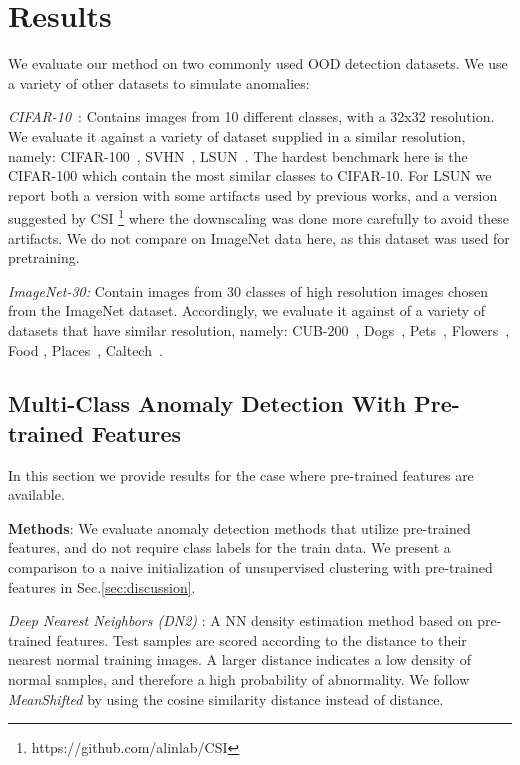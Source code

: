 \documentclass[runningheads]{llncs}
\begin{document}
\section{Results}
\label{sec:results}

We evaluate our method on two commonly used OOD detection datasets. We use a variety of other datasets to simulate anomalies:

\textit{CIFAR-10}~\cite{krizhevsky2009learning}: Contains images from 10 different classes, with a 32x32 resolution. We evaluate it against a variety of dataset supplied in a similar resolution, namely: CIFAR-100~\cite{krizhevsky2009learning}, SVHN~\cite{netzer2011reading}, LSUN~\cite{yu2015lsun}. The hardest benchmark here is the CIFAR-100 which contain the most similar classes to CIFAR-10. For LSUN we report both a version with some artifacts used by previous works, and a version suggested by CSI \cite{tack2020csi}\footnote{https://github.com/alinlab/CSI} where the downscaling was done more carefully to avoid these artifacts. We do not compare on ImageNet\cite{deng2009imagenet} data here, as this dataset was used for pretraining.



\textit{ImageNet-30:} Contain images from 30 classes of high resolution images chosen from the ImageNet\cite{deng2009imagenet} dataset. Accordingly, we evaluate it against of a variety of datasets that have similar resolution, namely: CUB-200~\cite{WelinderEtal2010}, Dogs~\cite{deng2009imagenet}, Pets~\cite{parkhi12a}, Flowers~\cite{Nilsback08}, Food \cite{bossard14}, Places~\cite{zhou2014learning}, Caltech~\cite{fei2004learning}. 



\subsection{Multi-Class Anomaly Detection With Pre-trained Features}
\label{sec:res_pre-trained}

In this section we provide results for the case where pre-trained features are available. 

\textbf{Methods}: We evaluate anomaly detection methods that utilize pre-trained features, and do not require class labels for the train data. We present a comparison to a naive initialization of unsupervised clustering with pre-trained features in Sec.\ref{sec:discussion}.

\textit{Deep Nearest Neighbors (DN2)} \cite{reiss2021panda}: A NN density estimation method based on pre-trained features. Test samples are scored according to the distance to their nearest normal training images. A larger distance indicates a low density of normal samples, and therefore a high probability of abnormality. We follow \textit{MeanShifted} \cite{reiss2021mean} by using the cosine similarity distance instead of  distance.
\end{document}
